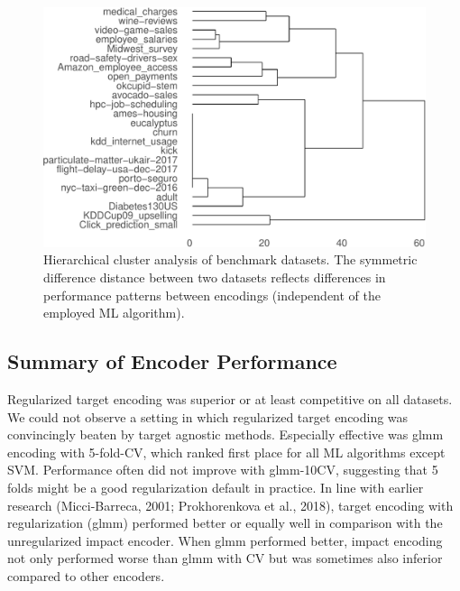 \documentclass[smallextended]{svjour3}       %
\begin{document}
\begin{figure}[!h]
\includegraphics[width=\textwidth]{dendrogram-1} \caption{Hierarchical cluster analysis of benchmark datasets. The symmetric difference distance between two datasets reflects differences in performance patterns between encodings (independent of the employed ML algorithm).}\label{fig:dendrogram}
\end{figure}

\hypertarget{summary-of-encoder-performance}{%
\subsection{Summary of Encoder Performance}\label{summary-of-encoder-performance}}

Regularized target encoding was superior or at least competitive on all datasets.
We could not observe a setting in which regularized target encoding was convincingly beaten by target agnostic methods.
Especially effective was glmm encoding with 5-fold-CV, which ranked first place for all ML algorithms except SVM.
Performance often did not improve with glmm-10CV, suggesting that 5 folds might be a good regularization default in practice.
In line with earlier research (Micci-Barreca, 2001; Prokhorenkova et al., 2018), target encoding with regularization (glmm) performed better or equally well in comparison with the unregularized impact encoder.
When glmm performed better, impact encoding not only performed worse than glmm with CV but was sometimes also inferior compared to other encoders.
\end{document}
